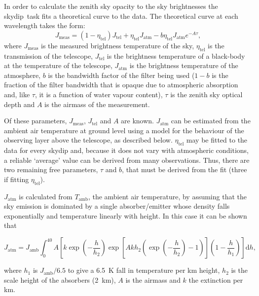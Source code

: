 \documentclass[twoside,11pt]{article}
\newcommand{\task}[1]{{\sf #1}}
\newcommand{\skydip}{\htmlref{\task{skydip}}{SKYDIP}}
\newcommand{\htmlref}[2]{#1}
\begin{document}
In order to calculate the zenith sky opacity to the sky brightnesses
the \skydip\ task fits a theoretical curve to the data. The theoretical
curve at each wavelength takes the form:
\begin{equation}
J_\mathrm{meas} = (1 - \eta_\mathrm{tel}) J_\mathrm{tel} +
                   \eta_\mathrm{tel} J_\mathrm{atm} -
                   b  \eta_\mathrm{tel} J_\mathrm{atm} e^{-A\tau},
\end{equation}
where $J_\mathrm{meas}$ is the measured brightness temperature of the 
sky, $\eta_\mathrm{tel}$ is the transmission of the telescope, 
$J_\mathrm{tel}$ is the brightness temperature of a black-body at the
temperature of the telescope, $J_\mathrm{atm}$ is the brightness 
temperature of the atmosphere, $b$ is the bandwidth factor of the filter 
being used ($1-b$ is the fraction of the filter bandwidth that is opaque
due to atmospheric absorption and, like $\tau$, it is a function of water
vapour content), $\tau$ is the zenith sky optical depth and $A$ is the
airmass of the measurement.

Of these parameters, $J_\mathrm{meas}$, $J_\mathrm{tel}$  and $A$ are known.
$J_\mathrm{atm}$ can be estimated from the ambient air temperature at ground
level using a model for the behaviour of the observing layer above the
telescope, as described below. $\eta_\mathrm{tel}$ may be fitted to the data
for every skydip and, because it does not vary with atmospheric conditions, a
reliable `average' value can be derived from many observations. Thus, there
are two remaining free parameters, $\tau$ and $b$, that must be derived
from the fit (three if fitting $\eta_\mathrm{tel}$).

$J_\mathrm{atm}$ is calculated from $T_\mathrm{amb}$, the ambient air
temperature, by assuming that the sky emission is dominated by a single
absorber/emitter whose density falls exponentially and temperature linearly
with height. In this case it can be shown that

\begin{equation}
J_\mathrm{atm} = J_\mathrm{amb} \int_0^{40}\! A \left[k\exp\left(-\frac{h}{h_2}
\right)\exp\left[A k h_2 \left(\exp\left(-\frac{h}{h_2}\right)-1\right)\right]
\left(1-\frac{h}{h_1}\right)\right]\mathrm{d}h,
\end{equation}

where $h_1$ is $J_\mathrm{amb}/6.5$ to give a 6.5~K fall in temperature per km
height, $h_2$ is the scale height of the absorbers (2~km), $A$ is the airmass
and $k$ the extinction per km.
\end{document}
